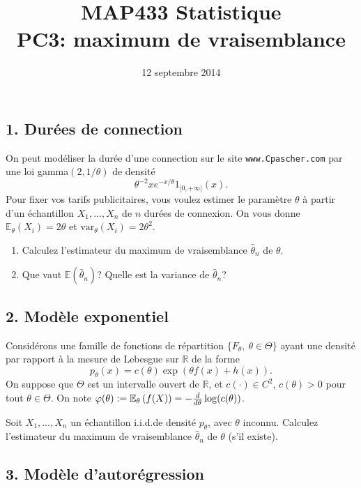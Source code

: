 \documentclass[a4paper,11pt,fleqn]{article}
\title{{\bf MAP433 Statistique}\\
{\bf PC3: maximum de vraisemblance}}
\date{12 septembre 2014}
\newcommand{\R}{\ensuremath{\mathbb{R}}}
\newcommand{\E}{\ensuremath{\mathbb{E}}}
\newcommand{\1}{\ensuremath{\mathbbm{1}}}
\newcommand{\pa}[1]{\left(#1\right)}
\begin{document}
\maketitle

\subsection*{1. Dur\'ees de connection}
On peut mod\'eliser la dur\'ee d'une connection sur le site {\tt www.Cpascher.com} par une loi gamma$(2,1/\theta)$ de densit\'e
$$\theta^{-2} x e^{-x/\theta }1_{[0,+\infty[}(x).$$
Pour fixer vos tarifs publicitaires, vous voulez estimer le
param\`etre $\theta$ \`a partir
 d'un \'echantillon $X_1,\ldots,X_n$  de $n$ dur\'ees de connexion. On vous
 donne $\E_{\theta}(X_{i})=2\theta$ et $\textrm{var}_{\theta}(X_{i})=2\theta^2$.
\begin{enumerate}
\item  Calculez l'estimateur du maximum de vraisemblance $\hat \theta_n$ de $\theta$.
\item  Que vaut $\E(\hat \theta_n)$?  Quelle est la variance de $\hat \theta_n$?
\end{enumerate}


\subsection*{2. Mod\`ele exponentiel}
Consid\'erons une
famille de fonctions de r\'epartition $\{F_{\theta},\ \theta\in\Theta\}$ ayant une
densit\'e par rapport \`a la mesure de Lebesgue sur $\R$
de la forme
$$p_{\theta}(x)=c(\theta)\exp\pa{\theta f(x)+h(x)}.$$
On suppose que $\Theta$ est un intervalle ouvert de $\R$, et $c(\cdot)\in C^2$,
$c(\theta)>0$ pour tout $\theta\in \Theta$. On note 
$\varphi(\theta):=\E_{\theta}\pa{f(X)}=-{d\over
d\theta}\log(c(\theta))$. 

Soit $X_{1},\ldots,X_{n}$ un \'echantillon i.i.d.\;de densit\'e $p_{\theta}$, avec $\theta$ inconnu.
 Calculez l'estimateur du maximum de vraisemblance $\hat \theta_n$ de $\theta$ (s'il existe).



\subsection*{3. Mod\`ele d'autor\'egression}
\end{document}
